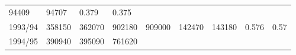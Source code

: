 \documentclass[
  spanish,
]{article}
\begin{document}
\begin{longtable}[]{@{}lllllllll@{}}
\begin{minipage}[t]{0.08\columnwidth}
94409\strut
\end{minipage} & \begin{minipage}[t]{0.09\columnwidth}\raggedright
94707\strut
\end{minipage} & \begin{minipage}[t]{0.08\columnwidth}\raggedright
0.379\strut
\end{minipage} & \begin{minipage}[t]{0.09\columnwidth}\raggedright
0.375\strut
\end{minipage}\tabularnewline
\begin{minipage}[t]{0.06\columnwidth}\raggedright
1993/94\strut
\end{minipage} & \begin{minipage}[t]{0.09\columnwidth}\raggedright
358150\strut
\end{minipage} & \begin{minipage}[t]{0.10\columnwidth}\raggedright
362070\strut
\end{minipage} & \begin{minipage}[t]{0.09\columnwidth}\raggedright
902180\strut
\end{minipage} & \begin{minipage}[t]{0.10\columnwidth}\raggedright
909000\strut
\end{minipage} & \begin{minipage}[t]{0.08\columnwidth}\raggedright
142470\strut
\end{minipage} & \begin{minipage}[t]{0.09\columnwidth}\raggedright
143180\strut
\end{minipage} & \begin{minipage}[t]{0.08\columnwidth}\raggedright
0.576\strut
\end{minipage} & \begin{minipage}[t]{0.09\columnwidth}\raggedright
0.57\strut
\end{minipage}\tabularnewline
\begin{minipage}[t]{0.06\columnwidth}\raggedright
1994/95\strut
\end{minipage} & \begin{minipage}[t]{0.09\columnwidth}\raggedright
390940\strut
\end{minipage} & \begin{minipage}[t]{0.10\columnwidth}\raggedright
395090\strut
\end{minipage} & \begin{minipage}[t]{0.09\columnwidth}\raggedright
761620\strut
\end{minipage} & \begin{minipage}[t]{0.10\columnwidth}\raggedright

\end{minipage}
\end{longtable}
\end{document}

